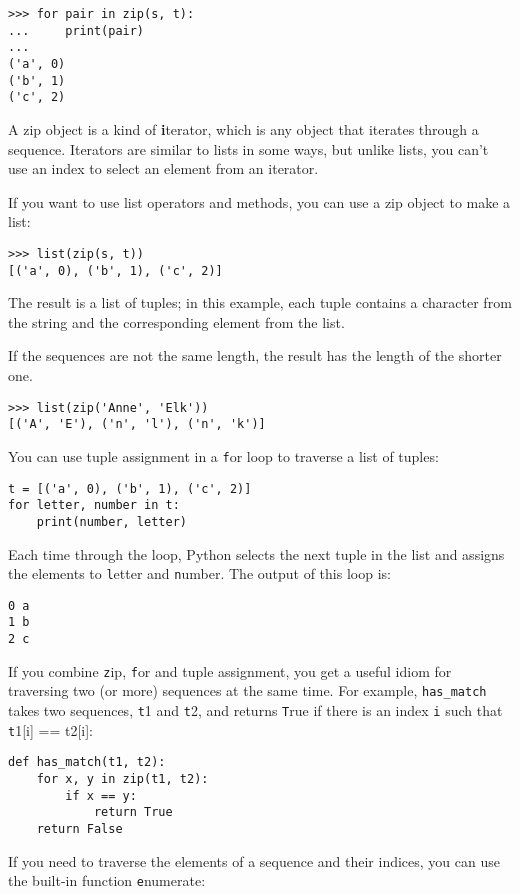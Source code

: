 \documentclass[
DIV=11,
fontsize=12,
twoside,
headinclude=false,
titlepage=firstiscover,
abstract=true,
headsepline=true,
footsepline=true,
chapterprefix=true, %
headings=big,
bibliography=totoc,%
captions=tableheading
]{scrbook}
\theoremstyle{definition}
\begin{document}
\begin{lstlisting}
>>> for pair in zip(s, t):
...     print(pair)
...
('a', 0)
('b', 1)
('c', 2)
\end{lstlisting}
%
A zip object is a kind of {\textbf iterator}, which is any object
that iterates through a sequence.  Iterators are similar to lists in some
ways, but unlike lists, you can't use an index to select an element from
an iterator.

If you want to use list operators and methods, you can
use a zip object to make a list:

\begin{lstlisting}
>>> list(zip(s, t))
[('a', 0), ('b', 1), ('c', 2)]
\end{lstlisting}
%
The result is a list of tuples; in this example, each tuple contains
a character from the string and the corresponding element from
the list.

If the sequences are not the same length, the result has the
length of the shorter one.

\begin{lstlisting}
>>> list(zip('Anne', 'Elk'))
[('A', 'E'), ('n', 'l'), ('n', 'k')]
\end{lstlisting}
%
You can use tuple assignment in a {\texttt for} loop to traverse a list of
tuples:

\begin{lstlisting}
t = [('a', 0), ('b', 1), ('c', 2)]
for letter, number in t:
    print(number, letter)
\end{lstlisting}
%
Each time through the loop, Python selects the next tuple in
the list and assigns the elements to {\texttt letter} and 
{\texttt number}.  The output of this loop is:

\begin{lstlisting}
0 a
1 b
2 c
\end{lstlisting}
%
If you combine {\texttt zip}, {\texttt for} and tuple assignment, you get a
useful idiom for traversing two (or more) sequences at the same
time.  For example, \verb"has_match" takes two sequences, {\texttt t1} and
{\texttt t2}, and returns {\texttt True} if there is an index {\texttt i}
such that {\texttt t1[i] == t2[i]}:

\begin{lstlisting}
def has_match(t1, t2):
    for x, y in zip(t1, t2):
        if x == y:
            return True
    return False
\end{lstlisting}
%
If you need to traverse the elements of a sequence and their
indices, you can use the built-in function {\texttt enumerate}:
\end{document}
